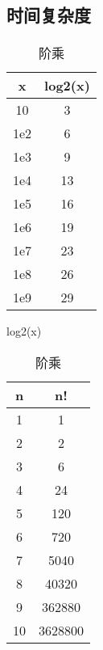 ﻿\subsection{时间复杂度}
	\paragraph{}
	\begin{table}[!htbp]
	\begin{minipage}{.5\linewidth}  		
		\begin{tabular}{|c|c|}
			\hline
			x & log2(x) \\
			\hline
			10 & 3 \\
			\hline
			1e2 & 6 \\
			\hline
			1e3 & 9 \\
			\hline
			1e4 & 13 \\
			\hline
			1e5 & 16 \\
			\hline
			1e6 & 19 \\
			\hline
			1e7 & 23 \\
			\hline
			1e8 & 26 \\
			\hline
			1e9 & 29 \\
			\hline
		\end{tabular}
		\caption{log2(x)}
	\end{minipage}\begin{minipage}{.5\linewidth} 		
		\begin{tabular}{|c|c|}
			\hline
			n & n! \\
			\hline
			1 & 1 \\
			\hline
			2 & 2 \\
			\hline
			3 & 6 \\
			\hline
			4 & 24 \\
			\hline
			5 & 120 \\
			\hline
			6 & 720 \\
			\hline
			7 & 5040 \\
			\hline
			8 & 40320 \\	
			\hline
			9 & 362880 \\
			\hline
			10 & 3628800 \\
			\hline
		\end{tabular}
		\caption{阶乘}
	\end{minipage}
	\end{table}	

